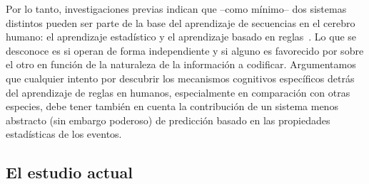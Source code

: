 
Por lo tanto, investigaciones previas indican que --como mínimo-- dos sistemas distintos pueden ser parte de la base del aprendizaje de secuencias en el cerebro humano: el aprendizaje estadístico y el aprendizaje basado en reglas~\cite{f4,f67,f85}. Lo que se desconoce es si operan de forma independiente y si alguno es favorecido por sobre el otro en función de la naturaleza de la información a codificar. Argumentamos que cualquier intento por descubrir los mecanismos cognitivos específicos detrás del aprendizaje de reglas en humanos, especialmente en comparación con otras especies, debe tener también en cuenta la contribución de un sistema menos abstracto (sin embargo poderoso) de predicción basado en las propiedades estadísticas de los eventos. 

\subsection{El estudio actual}


